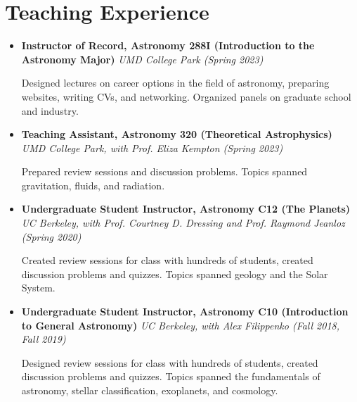 \documentclass[letterpaper,10.5pt]{article}
\newcommand{\resumeItem}[2]{
  \item\small{
    \textbf{#1}{#2 \vspace{-2pt}}
  }
}
\newcommand{\resumeSubHeadingListEnd}{\end{itemize}}
\newcommand{\resumeItemListStart}{\begin{itemize}}
\newcommand{\shorterSection}[1]{\vspace{-10pt}\section{#1}}
\begin{document}




\shorterSection{Teaching Experience}
\resumeItemListStart
\resumeItem{Instructor of Record, Astronomy 288I (Introduction to the Astronomy Major)}{ \textit{UMD College Park (Spring 2023)}}
    
    Designed lectures on career options in the field of astronomy, preparing websites, writing CVs, and networking. Organized panels on graduate school and industry. 
\resumeItem{Teaching Assistant, Astronomy 320 (Theoretical Astrophysics)}{ \textit{UMD College Park, with Prof. Eliza Kempton (Spring 2023)}}

Prepared review sessions and discussion problems. Topics spanned gravitation, fluids, and radiation.
\resumeItem{Undergraduate Student Instructor, Astronomy C12 (The Planets)}{ \textit{UC Berkeley, with Prof. Courtney D. Dressing and Prof. Raymond Jeanloz (Spring 2020)}}

Created review sessions for class with hundreds of students, created discussion problems and quizzes. Topics spanned geology and the Solar System.
\resumeItem{Undergraduate Student Instructor, Astronomy C10 (Introduction to General Astronomy)}{\textit{ UC Berkeley, with Alex Filippenko (Fall 2018, Fall 2019)}}

Designed review sessions for class with hundreds of students, created discussion problems and quizzes. Topics spanned the fundamentals of astronomy, stellar classification, exoplanets, and cosmology.
\resumeSubHeadingListEnd
\end{document}

